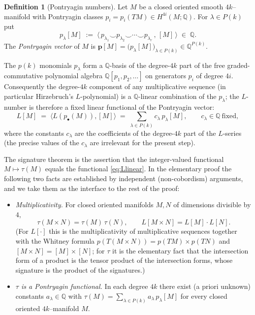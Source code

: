 \documentclass[12pt]{article}
\theoremstyle{definition}
\newtheorem{definition}{Definition}
\begin{document}
\begin{definition}[Pontryagin numbers]\label{def:pn}
Let $M$ be a closed oriented smooth $4k$--manifold with Pontryagin classes
$p_i=p_i(TM)\in H^{4i}(M;\mathbb{Q})$.  For $\lambda\in P(k)$ put
\[
p_\lambda[M]\;:=\;\big\langle\, p_{\lambda_1}\smile p_{\lambda_2}\smile\cdots\smile
p_{\lambda_r}\,,\,[M]\,\big\rangle\;\in\;\mathbb{Q}.
\]
The \emph{Pontryagin vector} of $M$ is
$\mathbf{p}[M]=\big(p_\lambda[M]\big)_{\lambda\in P(k)}\in\mathbb{Q}^{P(k)}$.
\end{definition}

The $p(k)$ monomials $p_\lambda$ form a $\mathbb{Q}$-basis of the degree-$4k$ part of
the free graded-commutative polynomial algebra $\mathbb{Q}[p_1,p_2,\dots]$ on generators
$p_i$ of degree $4i$.  Consequently the degree-$4k$ component of any multiplicative
sequence (in particular Hirzebruch's $L$-polynomial) is a $\mathbb{Q}$-linear
combination of the $p_\lambda$; the $L$-number is therefore a fixed linear functional of
the Pontryagin vector:
\[
L[M]\;=\;\big\langle L(p_\bullet(M)),[M]\big\rangle\;=\;
\sum_{\lambda\in P(k)} c_\lambda\, p_\lambda[M],
\qquad c_\lambda\in\mathbb{Q}\ \text{fixed},
\tag{1}\label{eq:Llinear}
\]
where the constants $c_\lambda$ are the coefficients of the degree-$4k$ part of the
$L$-series (the precise values of the $c_\lambda$ are irrelevant for the present step).

The signature theorem is the assertion that the integer-valued functional $M\mapsto
\tau(M)$ equals the functional \eqref{eq:Llinear}.  In the elementary proof the
following two facts are established by independent (non-cobordism) arguments, and we take
them as the interface to the rest of the proof:

\begin{itemize}
\item[\textbf{(I)}] \emph{Multiplicativity.} For closed oriented manifolds $M,N$ of
dimensions divisible by $4$,
\[
\tau(M\times N)=\tau(M)\,\tau(N),\qquad L[M\times N]=L[M]\cdot L[N].
\tag{2}\label{eq:mult}
\]
(For $L[\cdot]$ this is the multiplicativity of multiplicative sequences together with
the Whitney formula $p(T(M\times N))=p(TM)\times p(TN)$ and
$[M\times N]=[M]\times[N]$; for $\tau$ it is the elementary fact that the intersection
form of a product is the tensor product of the intersection forms, whose signature is
the product of the signatures.)
\item[\textbf{(II)}] \emph{$\tau$ is a Pontryagin functional.} In each degree $4k$ there
exist (a priori unknown) constants $a_\lambda\in\mathbb{Q}$ with
$\tau(M)=\sum_{\lambda\in P(k)}a_\lambda\, p_\lambda[M]$ for every closed oriented
$4k$--manifold $M$.
\end{itemize}
\end{document}
